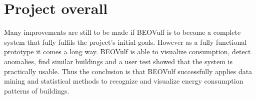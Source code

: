 \section{Project overall}
Many improvements are still to be made if BEOVulf is to become a complete system that fully fulfils the project’s initial goals. However as a fully functional prototype it comes a long way. BEOVulf is able to visualize consumption, detect anomalies, find similar buildings and a user test showed that the system is practically usable. Thus the conclusion is that BEOVulf successfully applies data mining and statistical methods to recognize and visualize energy consumption patterns of buildings.
